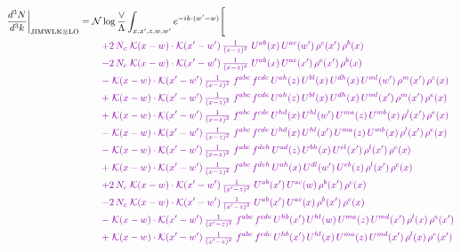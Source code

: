 \documentclass[10pt]{article}
\numberwithin{equation}{section}
\newcommand{\NN}{\mathcal N\log\frac{\vee}{\Lambda}}
\begin{document}
\begin{align}
\frac{d^3N}{d^3k}\bigg|_{{\rm JIMWLK}\otimes{\rm LO}}={}&\NN\int_{x,x',z,w,w'}e^{-ik\cdot(w'-w)}\Bigg[\notag\\
&\quad{\color{CC}+2\,N_c\;\mathcal{K}(x-w)\cdot\mathcal{K}(x'-w')\,\tfrac{1}{(x-z)^{2}}\;U^{ab}(x)\,U^{ac}(w')\,\rho^{c}(x')\,\rho^{b}(x)}\notag\\
&\quad{\color{CC}-2\,N_c\;\mathcal{K}(x-w)\cdot\mathcal{K}(x'-w')\,\tfrac{1}{(x-z)^{2}}\;U^{ab}(x)\,U^{ac}(x')\,\rho^{c}(x')\,\rho^{b}(x)}\notag\\
&\quad{\color{CC}-\;\mathcal{K}(x-w)\cdot\mathcal{K}(x'-w')\,\tfrac{1}{(x-z)^{2}}\;f^{abc}\,f^{cde}\,U^{ah}(z)\,U^{bl}(x)\,U^{dh}(x)\,U^{ml}(w')\,\rho^{m}(x')\,\rho^{e}(x)}\notag\\
&\quad{\color{CC}+\;\mathcal{K}(x-w)\cdot\mathcal{K}(x'-w')\,\tfrac{1}{(x-z)^{2}}\;f^{abc}\,f^{cde}\,U^{ah}(z)\,U^{bl}(x)\,U^{dh}(x)\,U^{ml}(x')\,\rho^{m}(x')\,\rho^{e}(x)}\notag\\
&\quad{\color{CC}+\;\mathcal{K}(x-w)\cdot\mathcal{K}(x'-w')\,\tfrac{1}{(x-z)^{2}}\;f^{abc}\,f^{cde}\,U^{hd}(x)\,U^{hl}(w')\,U^{ma}(z)\,U^{mb}(x)\,\rho^{l}(x')\,\rho^{e}(x)}\notag\\
&\quad{\color{CC}-\;\mathcal{K}(x-w)\cdot\mathcal{K}(x'-w')\,\tfrac{1}{(x-z)^{2}}\;f^{abc}\,f^{cde}\,U^{hd}(x)\,U^{hl}(x')\,U^{ma}(z)\,U^{mb}(x)\,\rho^{l}(x')\,\rho^{e}(x)}\notag\\
&\quad{\color{CC}-\;\mathcal{K}(x-w)\cdot\mathcal{K}(x'-w')\,\tfrac{1}{(x-z)^{2}}\;f^{abc}\,f^{deh}\,U^{ad}(z)\,U^{bh}(x)\,U^{el}(x')\,\rho^{l}(x')\,\rho^{c}(x)}\notag\\
&\quad{\color{CC}+\;\mathcal{K}(x-w)\cdot\mathcal{K}(x'-w')\,\tfrac{1}{(x-z)^{2}}\;f^{abc}\,f^{deh}\,U^{ah}(x)\,U^{dl}(w')\,U^{eb}(z)\,\rho^{l}(x')\,\rho^{c}(x)}\notag\\
&\quad{\color{CC}+2\,N_c\;\mathcal{K}(x-w)\cdot\mathcal{K}(x'-w')\,\tfrac{1}{(x'-z)^{2}}\;U^{ab}(x')\,U^{ac}(w)\,\rho^{b}(x')\,\rho^{c}(x)}\notag\\
&\quad{\color{CC}-2\,N_c\;\mathcal{K}(x-w)\cdot\mathcal{K}(x'-w')\,\tfrac{1}{(x'-z)^{2}}\;U^{ab}(x')\,U^{ac}(x)\,\rho^{b}(x')\,\rho^{c}(x)}\notag\\
&\quad{\color{CC}-\;\mathcal{K}(x-w)\cdot\mathcal{K}(x'-w')\,\tfrac{1}{(x'-z)^{2}}\;f^{abc}\,f^{cde}\,U^{hb}(x')\,U^{hl}(w)\,U^{ma}(z)\,U^{md}(x')\,\rho^{l}(x)\,\rho^{e}(x')}\notag\\
&\quad{\color{CC}+\;\mathcal{K}(x-w)\cdot\mathcal{K}(x'-w')\,\tfrac{1}{(x'-z)^{2}}\;f^{abc}\,f^{cde}\,U^{hb}(x')\,U^{hl}(x)\,U^{ma}(z)\,U^{md}(x')\,\rho^{l}(x)\,\rho^{e}(x')}\notag\\

\end{align}
\end{document}
